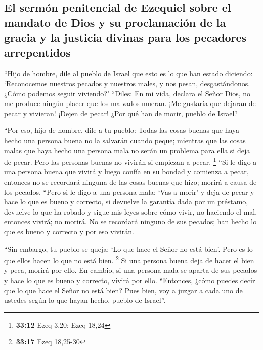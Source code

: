 \hypertarget{el-sermuxf3n-penitencial-de-ezequiel-sobre-el-mandato-de-dios-y-su-proclamaciuxf3n-de-la-gracia-y-la-justicia-divinas-para-los-pecadores-arrepentidos}{%
\subsection{El sermón penitencial de Ezequiel sobre el mandato de Dios y
su proclamación de la gracia y la justicia divinas para los pecadores
arrepentidos}\label{el-sermuxf3n-penitencial-de-ezequiel-sobre-el-mandato-de-dios-y-su-proclamaciuxf3n-de-la-gracia-y-la-justicia-divinas-para-los-pecadores-arrepentidos}}

 ``Hijo de hombre, dile al pueblo de Israel que esto es
lo que han estado diciendo: `Reconocemos nuestros pecados y nuestros
males, y nos pesan, desgastándonos. ¿Cómo podemos seguir viviendo?'
 ``Diles: En mi vida, declara el Señor Dios, no me
produce ningún placer que los malvados mueran. ¡Me gustaría que dejaran
de pecar y vivieran! ¡Dejen de pecar! ¿Por qué han de morir, pueblo de
Israel?

 ``Por eso, hijo de hombre, dile a tu pueblo: Todas las
cosas buenas que haya hecho una persona buena no la salvarán cuando
peque; mientras que las cosas malas que haya hecho una persona mala no
serán un problema para ella si deja de pecar. Pero las personas buenas
no vivirán si empiezan a pecar. \footnote{\textbf{33:12} Ezeq 3,20; Ezeq
  18,24}  ``Si le digo a una persona buena que vivirá y
luego confía en su bondad y comienza a pecar, entonces no se recordará
ninguna de las cosas buenas que hizo; morirá a causa de los pecados.
 ``Pero si le digo a una persona mala: `Vas a morir' y
deja de pecar y hace lo que es bueno y correcto,  si
devuelve la garantía dada por un préstamo, devuelve lo que ha robado y
sigue mis leyes sobre cómo vivir, no haciendo el mal, entonces vivirá;
no morirá.  No se recordará ninguno de sus pecados; han
hecho lo que es bueno y correcto y por eso vivirán.

 ``Sin embargo, tu pueblo se queja: `Lo que hace el Señor
no está bien'. Pero es lo que ellos hacen lo que no está bien.
\footnote{\textbf{33:17} Ezeq 18,25-30}  Si una persona
buena deja de hacer el bien y peca, morirá por ello.  En
cambio, si una persona mala se aparta de sus pecados y hace lo que es
bueno y correcto, vivirá por ello.  ``Entonces, ¿cómo
puedes decir que lo que hace el Señor no está bien? Pues bien, voy a
juzgar a cada uno de ustedes según lo que hayan hecho, pueblo de
Israel''.

